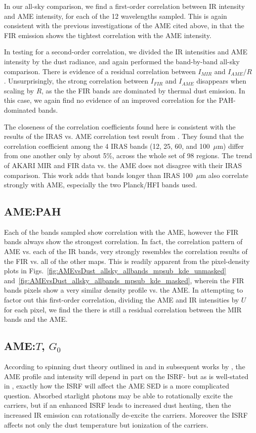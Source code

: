          In our all-sky comparison, we find a first-order correlation between IR intensity and AME intensity, for each of the 12 wavelengths sampled. This is again consistent with the previous investigations of the AME cited above, in that the FIR emission shows the tightest correlation with the AME intensity.

         In testing for a second-order correlation, we divided the IR intensities and AME intensity by the dust radiance, and again performed the band-by-band all-sky comparison. There is evidence of a residual correlation between $I_{MIR}$ and $I_{AME}/R$. Unsurprisingly, the strong correlation between $I_{FIR}$ and $I_{AME}$ disappears when scaling by $R$, as the the FIR bands are dominated by thermal dust emission. In this case, we again find no evidence of an improved correlation for the PAH-dominated bands.

           The closeness of the correlation coefficients found here is consistent with the results of the IRAS vs. AME correlation test result from \cite{planckXV}. They found that the correlation coefficient among the 4 IRAS bands (12, 25, 60, and 100~$\mu$m) differ from one another only by about 5\%, across the whole set of 98 regions. The trend of AKARI MIR and FIR data vs. the AME does not disagree with their IRAS comparison. This work adds that bands longer than IRAS 100~$\mu$m also correlate strongly with AME, especially the two Planck/HFI bands used.

          \subsection{AME:PAH}
            Each of the bands sampled show correlation with the AME, however the FIR bands always show the strongest correlation. In fact, the correlation pattern of AME vs. each of the IR bands, very strongly resembles the correlation results of the FIR vs. all of the other maps. This is readily apparent from the pixel-density plots in Figs.~\ref{fig:AMEvsDust_allsky_allbands_mpsub_kde_unmasked} and~\ref{fig:AMEvsDust_allsky_allbands_mpsub_kde_masked}, wherein the FIR bands pixels show a very similar density profile vs. the AME. In attempting to factor out this first-order correlation, dividing the AME and IR intensities by $U$ for each pixel, we find the there is still a residual correlation between the MIR bands and the AME.

          \subsection{AME:$T$, $G_{0}$}
            According to spinning dust theory outlined in \cite{draine98a} and in subsequent works by \cite{ysard10a}, the AME profile and intensity will depend in part on the ISRF- but as is well-stated in \cite{hensley17a}, exactly how the ISRF will affect the AME SED is a more complicated question. Absorbed starlight photons may be able to rotationally excite the carriers, but if an enhanced ISRF leads to increased dust heating, then the increased IR emission can rotationally de-excite the carriers. Moreover the ISRF affects not only the dust temperature but ionization of the carriers.

